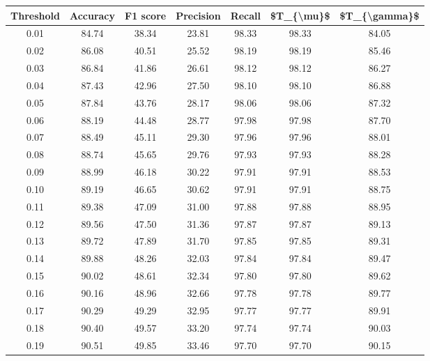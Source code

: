 \begin{tabular}{|c|c|c|c|c|c|c|}
\hline
 Threshold &  Accuracy &  F1 score &  Precision &  Recall &  \$T\_\{\textbackslash mu\}\$ &  \$T\_\{\textbackslash gamma\}\$ \\
\hline
      0.01 &     84.74 &     38.34 &      23.81 &   98.33 &      98.33 &         84.05 \\
      0.02 &     86.08 &     40.51 &      25.52 &   98.19 &      98.19 &         85.46 \\
      0.03 &     86.84 &     41.86 &      26.61 &   98.12 &      98.12 &         86.27 \\
      0.04 &     87.43 &     42.96 &      27.50 &   98.10 &      98.10 &         86.88 \\
      0.05 &     87.84 &     43.76 &      28.17 &   98.06 &      98.06 &         87.32 \\
      0.06 &     88.19 &     44.48 &      28.77 &   97.98 &      97.98 &         87.70 \\
      0.07 &     88.49 &     45.11 &      29.30 &   97.96 &      97.96 &         88.01 \\
      0.08 &     88.74 &     45.65 &      29.76 &   97.93 &      97.93 &         88.28 \\
      0.09 &     88.99 &     46.18 &      30.22 &   97.91 &      97.91 &         88.53 \\
      0.10 &     89.19 &     46.65 &      30.62 &   97.91 &      97.91 &         88.75 \\
      0.11 &     89.38 &     47.09 &      31.00 &   97.88 &      97.88 &         88.95 \\
      0.12 &     89.56 &     47.50 &      31.36 &   97.87 &      97.87 &         89.13 \\
      0.13 &     89.72 &     47.89 &      31.70 &   97.85 &      97.85 &         89.31 \\
      0.14 &     89.88 &     48.26 &      32.03 &   97.84 &      97.84 &         89.47 \\
      0.15 &     90.02 &     48.61 &      32.34 &   97.80 &      97.80 &         89.62 \\
      0.16 &     90.16 &     48.96 &      32.66 &   97.78 &      97.78 &         89.77 \\
      0.17 &     90.29 &     49.29 &      32.95 &   97.77 &      97.77 &         89.91 \\
      0.18 &     90.40 &     49.57 &      33.20 &   97.74 &      97.74 &         90.03 \\
      0.19 &     90.51 &     49.85 &      33.46 &   97.70 &      97.70 &         90.15 \\

\end{tabular}
